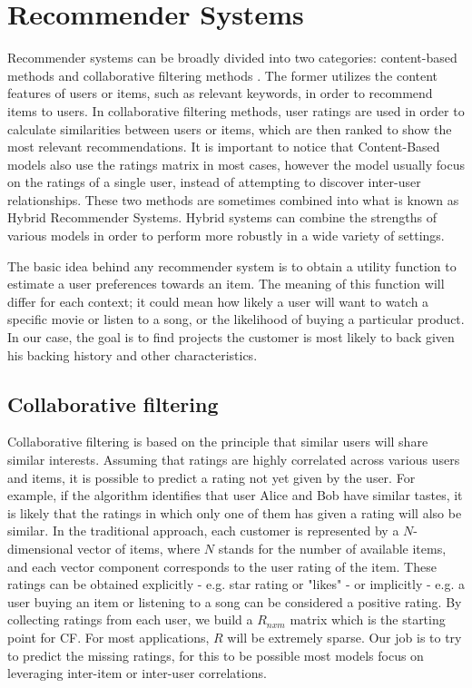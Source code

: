 \documentclass[cic,tc,english]{iiufrgs}
\begin{document}
\section{Recommender Systems}
Recommender systems can be broadly divided into two categories: content-based methods and collaborative filtering methods \cite{Rakesh2016}.
The former utilizes the content features of users or items, such as relevant keywords, in order to recommend items to users. In collaborative filtering methods, user ratings are used in order to calculate similarities between users or items, which are then ranked to show the most relevant recommendations. It is important to notice that Content-Based models also use the ratings matrix in most cases, however the model usually focus on the ratings of a single user, instead of attempting to discover inter-user relationships. These two methods are sometimes combined into what is known as Hybrid Recommender Systems. Hybrid systems can combine the strengths of various models in order to perform more robustly in a wide variety of settings.

The basic idea behind any recommender system is to obtain a utility function to estimate a user preferences towards an item. The meaning of this function will differ for each context; it could mean how likely a user will want to watch a specific movie or listen to a song, or the likelihood of buying a particular product. In our case, the goal is to find projects the customer is most likely to back given his backing history and other characteristics. 


\subsection{Collaborative filtering}
Collaborative filtering is based on the principle that similar users will share similar interests. Assuming that ratings are highly correlated across various users and items, it is possible to predict a rating not yet given by the user. For example, if the algorithm identifies that user Alice and Bob have similar tastes, it is likely that the ratings in which only one of them has given a rating will also be similar. In the traditional approach, each customer is represented by a \(N\)-dimensional vector of items, where \(N\) stands for the number of available items, and each vector component corresponds to the user rating of the item. These ratings can be obtained explicitly - e.g. star rating or "likes" - or implicitly - e.g. a user buying an item or listening to a song can be considered a positive rating. By collecting ratings from each user, we build a \(R_{nxm}\) matrix which is the starting point for CF. For most applications, \(R\) will be extremely sparse. Our job is to try to predict the missing ratings, for this to be possible most models focus on leveraging inter-item or inter-user correlations.
\end{document}

